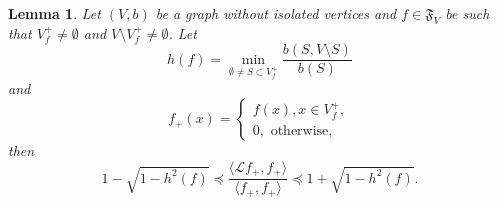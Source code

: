 \documentclass[10pt,a4paper]{amsart}
\newtheorem{lemma}{Lemma}
\newcommand{\F}{\mathfrak{F}}
\renewcommand{\L}{\mathcal{L}}
\begin{document}
\begin{lemma}
Let $(V,b)$ be a graph without isolated vertices and $f\in \F_V$ be such that $V^+_f\ne\emptyset$ and $V\setminus V^+_f\ne\emptyset$. Let
\begin{equation*}
h(f)=\min_{\emptyset\ne S\subset V^+_f}\dfrac{b(S, V\setminus S)}{b(S)}
\end{equation*}
and 
$$
f_+(x)=\begin{cases}
f(x), x\in V^+_f,\\
0, \mbox{ otherwise},
\end{cases}
$$
then
\begin{equation*}
1-\sqrt{1-h^2(f)}\preceq \dfrac{\langle\L f_+, f_+\rangle}{\langle f_+, f_+\rangle} \preceq 1+\sqrt{1-h^2(f)}.
\end{equation*}


\end{lemma}
\end{document}
